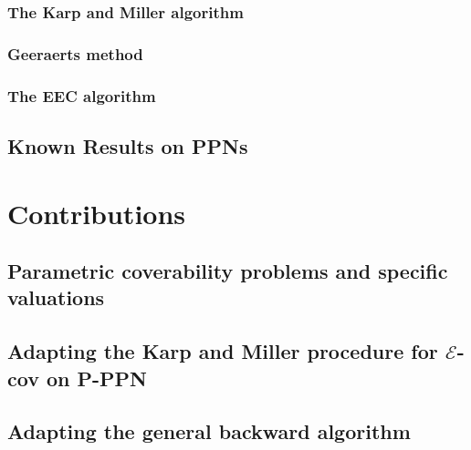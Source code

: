 \documentclass[11pt,a4paper,oneside]{book}
\theoremstyle{plain}
\theoremstyle{definition}
\theoremstyle{remark}
\newcommand{\Ecov}{$\mathscr{E}$-cov\xspace}
\begin{document}
\subsection{The Karp and Miller algorithm}
\label{sec:the-karp-and-miller-algorithm}
\label{sec:km}


\subsection{Geeraerts method}
\label{geeraerts-method}
\label{sec:eff}


\subsection{The \ac{EEC} algorithm}
\label{the-ecc-algorithm}
\label{sec:eec}



%
\section{Known Results on \acp{PPN}}
\label{sec:known-results-on-ppn}


\chapter{Contributions}
\label{sec:contributions}


\section{Parametric coverability problems and specific valuations}
\label{sec:parametric-coverability-problems-and-specific-valuations}


\section{Adapting the Karp and Miller procedure for \Ecov on P-\ac{PPN}}
\label{sec:adapting-the-karp-and-miller-procedure-for-ecov-on-p-ppn}


\section{Adapting the general backward algorithm}
\label{sec:adapting-the-general-backward-algorithm}

\end{document}
